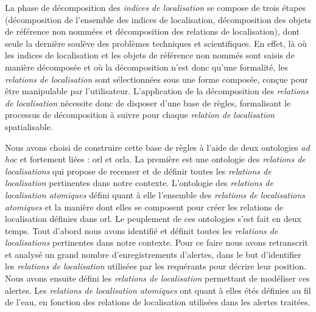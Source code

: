 La phase de décomposition des \emph{indices de localisation} se
compose de trois étapes (décomposition de l'ensemble des indices de
localisation, décomposition des objets de référence non nommées et
décomposition des relations de localisation), dont seule la dernière
soulève des problèmes techniques et scientifiques. En effet, là où les
indices de localisation et les objets de référence non nommés sont
saisis de manière décomposée et où la décomposition n'est donc qu'une
formalité, les \emph{relations de localisation} sont sélectionnées
sous une forme composée, conçue pour être manipulable par
l'utilisateur. L’application de la décomposition des \emph{relations
  de localisation} nécessite donc de disposer d'une base de règles,
formalisant le processus de décomposition à suivre pour chaque
\emph{relation de localisation} spatialisable.

Nous avons choisi de construire cette base de règles à l'aide de deux
ontologies \emph{ad hoc} et fortement liées : \ac{orl} et
\ac{orla}. La première est une ontologie des \emph{relations de
  localisations} qui propose de recenser et de définir toutes les
\emph{relations de localisation} pertinentes dans notre
contexte. L'ontologie des \emph{relations de localisation atomiques}
défini quant à elle l'ensemble des \emph{relations de localisations
  atomiques} et la manière dont elles se composent pour créer les
relations de localisation définies dans \ac{orl}. Le peuplement de ces
ontologies s'est fait en deux temps. Tout d'abord nous avons identifié
et définit toutes les \emph{relations de localisations} pertinentes
dans notre contexte. Pour ce faire nous avons retranscrit et analysé
un grand nombre d'enregistrements d'alertes, dans le but d'identifier
les \emph{relations de localisation} utilisées par les requérants pour
décrire leur position. Nous avons ensuite défini les \emph{relations
  de localisation} permettant de modéliser ces alertes. Les
\emph{relations de localisation atomiques} ont quant à elles étés
définies au fil de l'eau, en fonction des relations de localisation
utilisées dans les alertes traitées.

